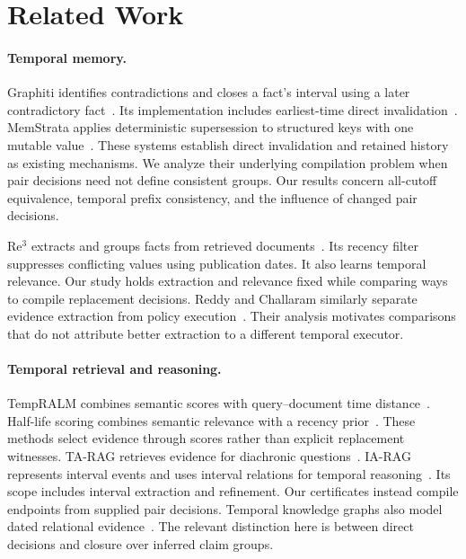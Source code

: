 \section{Related Work}
\label{sec:related}

\paragraph{Temporal memory.}
Graphiti identifies contradictions and closes a fact's interval using a later contradictory fact~\citep{rasmussen2025zep}.
Its implementation includes earliest-time direct invalidation~\citep{graphiti2026source}.
MemStrata applies deterministic supersession to structured keys with one mutable value~\citep{yadav2026memstrata}.
These systems establish direct invalidation and retained history as existing mechanisms.
We analyze their underlying compilation problem when pair decisions need not define consistent groups.
Our results concern all-cutoff equivalence, temporal prefix consistency, and the influence of changed pair decisions.

Re$^3$ extracts and groups facts from retrieved documents~\citep{cao2026re3}.
Its recency filter suppresses conflicting values using publication dates.
It also learns temporal relevance.
Our study holds extraction and relevance fixed while comparing ways to compile replacement decisions.
Reddy and Challaram similarly separate evidence extraction from policy execution~\citep{reddy2026assembly}.
Their analysis motivates comparisons that do not attribute better extraction to a different temporal executor.

\paragraph{Temporal retrieval and reasoning.}
TempRALM combines semantic scores with query--document time distance~\citep{gade2025tempralm}.
Half-life scoring combines semantic relevance with a recency prior~\citep{grofsky2025ragtime}.
These methods select evidence through scores rather than explicit replacement witnesses.
TA-RAG retrieves evidence for diachronic questions~\citep{lau2025tarag}.
IA-RAG represents interval events and uses interval relations for temporal reasoning~\citep{wang2026iarag}.
Its scope includes interval extraction and refinement.
Our certificates instead compile endpoints from supplied pair decisions.
Temporal knowledge graphs also model dated relational evidence~\citep{trivedi2017knowevolve,lacroix2020tensor}.
The relevant distinction here is between direct decisions and closure over inferred claim groups.

